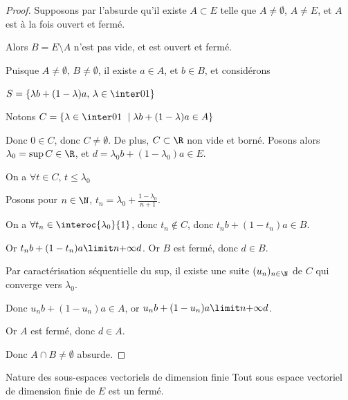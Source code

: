 \begin{proof}
    Supposons par l'absurde qu'il existe $A \subset E$ telle que $A \neq \emptyset$, $A \neq E$, et $A$ est à la fois ouvert et fermé.

    Alors $B = E \setminus A$ n'est pas vide, et est ouvert et fermé. 

    Puisque $A \neq \emptyset, \, B \neq \emptyset$, il existe $a \in A$, et $b \in B$, 
    et considérons 
    
    $S = \left\{\lambda b + (1 - \lambda )a, \, \lambda \in \inter 0 1\right\}$

    Notons $C = \left\{\lambda \in \inter 0 1 \ \mid \lambda b + (1 - \lambda )a \in A\right\}$

    Donc $0 \in C$, donc $C \neq \emptyset$.
    De plus, $C \subset \R$ non vide et borné. Posons alors $\lambda_0 = \sup C \in \R$, et 
    $d = \lambda_0 b + (1 - \lambda_0)a \in E$.

    On a $\forall t \in C, \, t \leqslant \lambda_0$

    Posons pour $\displaystyle n \in \N$, $\displaystyle t_n = \lambda_0 + \frac{1 - \lambda_0}{n + 1}$. 

    On a $\forall t_n \in \interoc{\lambda_0}{1}$, donc $t_n \not \in C$, donc $t_n b + (1 - t_n)a \in B$.

    Or $t_n b + (1 - t_n)a \limit n {+ \infty} d$. Or $B$ est fermé, donc $d \in B$.

    Par caractérisation séquentielle du sup, il existe une suite $(u_n)_{n \in \N}$ de $C$ qui converge 
    vers $\lambda_0$.

    Donc $u_n b + (1 - u_n)a \in A$, or $u_n b + (1 - u_n)a \limit n {+ \infty} d$.

    Or $A$ est fermé, donc $d \in A$.

    Donc $A \cap B \neq \emptyset$ absurde.
\end{proof}

\begin{theoreme}{Nature des sous-espaces vectoriels de dimension finie}{}
    Tout sous espace vectoriel de dimension finie de $E$ est un fermé. 
\end{theoreme}


